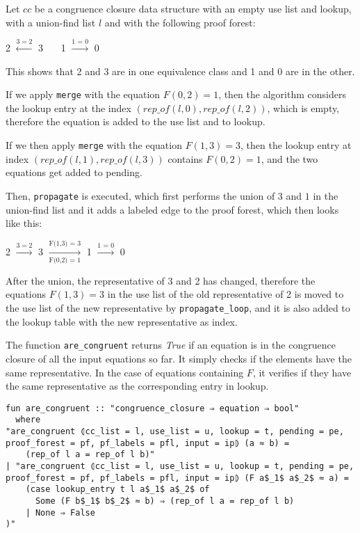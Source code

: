 \begin{exmp}\label{example:merge}
Let $cc$ be a congruence closure data structure with an empty use list and lookup, with a union-find list $l$ and with the following proof forest:

2 $\xleftarrow{3 = 2}$ 3 \ \ \ 1 $\xrightarrow{\text{1 = 0}}$ 0 \

This shows that 2 and 3 are in one equivalence class and 1 and 0 are in the other.

If we apply \lstinline{merge} with the equation $F(0,2) = 1$, then the algorithm considers the lookup entry at the index $(rep\_of(l, 0), rep\_of(l, 2))$, which is empty, therefore the equation is added to the use list and to lookup.

If we then apply \lstinline|merge| with the equation $F(1,3) = 3$, then the lookup entry at index $(rep\_of(l, 1), rep\_of(l, 3))$ contains $F(0,2) = 1$, and the two equations get added to pending.

Then, \lstinline|propagate| is executed, which first performs the union of $3$ and $1$ in the union-find list and it adds a labeled edge to the proof forest, which then looks like this:

2 $\xrightarrow{3 = 2}$ 3 $\xrightarrow[\text{F(0,2) = 1}]{\text{F(1,3) = 3}}$ 1 $\xrightarrow{\text{1 = 0}}$ 0 \

After the union, the representative of 3 and 2 has changed, therefore the equations $F(1,3) = 3$ in the use list of the old representative of 2 is moved to the use list of the new representative by \lstinline|propagate_loop|, and it is also added to the lookup table with the new representative as index.
\end{exmp}

The function \lstinline{are_congruent} returns \emph{True} if an equation is in the congruence closure of all the input equations so far. It simply checks if the elements have the same representative. In the case of equations containing $F$, it verifies if they have the same representative as the corresponding entry in lookup.

\begin{lstlisting}
fun are_congruent :: "congruence_closure ⇒ equation ⇒ bool"
  where
"are_congruent ⦇cc_list = l, use_list = u, lookup = t, pending = pe, proof_forest = pf, pf_labels = pfl, input = ip⦈ (a ≈ b) =
    (rep_of l a = rep_of l b)"
| "are_congruent ⦇cc_list = l, use_list = u, lookup = t, pending = pe, proof_forest = pf, pf_labels = pfl, input = ip⦈ (F a$_1$ a$_2$ ≈ a) =
    (case lookup_entry t l a$_1$ a$_2$ of
      Some (F b$_1$ b$_2$ ≈ b) ⇒ (rep_of l a = rep_of l b)
    | None ⇒ False
)"
\end{lstlisting}

